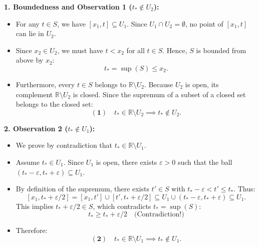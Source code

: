 \begin{proofWrapper}
\begin{content}
\textbf{1. Boundedness and Observation 1 ($t_* \notin U_2$):}
\begin{itemize}
    \item For any $t \in S$, we have $[x_1, t] \subseteq U_1$. Since $U_1 \cap U_2 = \emptyset$, no point of $[x_1, t]$ can lie in $U_2$.
    \item Since $x_2 \in U_2$, we must have $t < x_2$ for all $t \in S$. Hence, $S$ is bounded from above by $x_2$:
    \begin{equation}\label{eq:tstar-le-x2}
    t_* = \sup(S) \le x_2.
    \end{equation}
    \item Furthermore, every $t \in S$ belongs to $\mathbb{R} \setminus U_2$. Because $U_2$ is open, its complement $\mathbb{R} \setminus U_2$ is closed. Since the supremum of a subset of a closed set belongs to the closed set:
    \begin{equation}\label{eq:obs1-tstar}
    \mathbf{(1)} \quad t_* \in \mathbb{R} \setminus U_2 \implies t_* \notin U_2.
    \end{equation}
\end{itemize}

\textbf{2. Observation 2 ($t_* \notin U_1$):}
\begin{itemize}
    \item We prove by contradiction that $t_* \in \mathbb{R} \setminus U_1$.
    \item Assume $t_* \in U_1$. Since $U_1$ is open, there exists $\varepsilon > 0$ such that the ball $(t_* - \varepsilon, t_* + \varepsilon) \subseteq U_1$.
    \item By definition of the supremum, there exists $t' \in S$ with $t_* - \varepsilon < t' \le t_*$. Thus:
    \[
    [x_1, t_* + \varepsilon/2] = [x_1, t'] \cup [t', t_* + \varepsilon/2] \subseteq U_1 \cup (t_* - \varepsilon, t_* + \varepsilon) \subseteq U_1.
    \]
    This implies $t_* + \varepsilon/2 \in S$, which contradicts $t_* = \sup(S)$:
    \[
    t_* \ge t_* + \varepsilon/2 \quad \text{(Contradiction!)}
    \]
    \item Therefore:
    \begin{equation}\label{eq:obs2-tstar}
    \mathbf{(2)} \quad t_* \in \mathbb{R} \setminus U_1 \implies t_* \notin U_1.
    \end{equation}
\end{itemize}


\end{content}
\end{proofWrapper}
